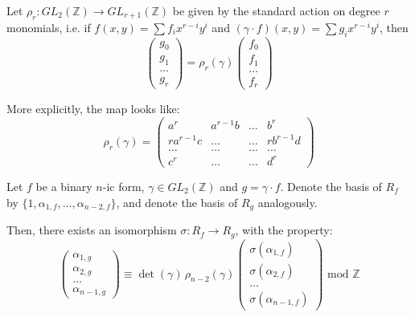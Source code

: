 \documentclass{report}
\begin{document}
\begin{definition}
Let $\rho_r : GL_2(\mathbb{Z}) \to GL_{r+1}(\mathbb{Z})$ be given by the standard action on degree $r$ monomials, i.e. if $f(x,y) = \sum f_i x^{r-i} y^i$ and $(\gamma \cdot f)(x,y) = \sum g_i x^{r-i} y^i$, then
\begin{equation}
\begin{pmatrix}
g_0 \\ g_1 \\ \ldots \\ g_r
\end{pmatrix}
= \rho_r (\gamma)
\begin{pmatrix}
f_0 \\ f_1 \\ \ldots \\ f_r
\end{pmatrix}
\end{equation}

More explicitly, the map looks like:
\begin{equation}
\rho_r (\gamma) =
\begin{pmatrix}
a^r & a^{r-1} b & \ldots & b^r \\
r a^{r-1} c & \ldots & \ldots & r b^{r-1} d\\
\ldots & \ldots & \ldots & \ldots \\
c^r & \ldots & \ldots & d^r
\end{pmatrix}
\end{equation}

\end{definition}


\begin{theorem}  \label{nakagawa}
Let $f$ be a binary $n$-ic form, $\gamma \in GL_2(\mathbb{Z})$ and $g = \gamma \cdot f$.  Denote the basis of $R_f$ by $\{1, \alpha_{1,f},\ldots,\alpha_{n-2,f}\}$, and denote the basis of $R_g$ analogously.

Then, there exists an isomorphism $\sigma : R_f \to R_g$, with the property:
\begin{equation}
\begin{pmatrix}
\alpha_{1,g} \\ \alpha_{2,g} \\ \ldots \\ \alpha_{n-1,g}
\end{pmatrix}
\equiv
\det(\gamma) \, \rho_{n-2} (\gamma)
\begin{pmatrix}
\sigma(\alpha_{1,f}) \\ \sigma(\alpha_{2,f}) \\ \ldots \\ \sigma(\alpha_{n-1,f})
\end{pmatrix}
\text{ mod } \mathbb{Z}
\end{equation}

\end{theorem}
\end{document}
